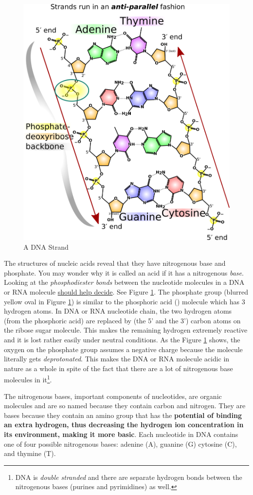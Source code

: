\documentclass[12pt]{article}
\begin{document}
\begin{figure}[ht!]
    \centering
    \includegraphics[width=0.6\linewidth]{DNA_chemical_structure-madprime.png}
    \caption{A DNA Strand}
    \label{fig: dna-strand}
\end{figure}


The structures of nucleic acids reveal that they have nitrogenous base and phosphate. You may wonder why it is called an acid if it has a nitrogenous \emph{base}. Looking at the \emph{phosphodiester bonds} between the nucleotide molecules in a DNA or RNA molecule \href{https://biology.stackexchange.com/questions/3864/dna-as-an-acid}{should help decide}. See Figure \ref{fig: dna-strand}. The phosphate group (blurred yellow oval in Figure \ref{fig: dna-strand}) is similar to the phosphoric acid () molecule which has 3 hydrogen atoms. In DNA or RNA nucleotide chain, the two hydrogen atoms (from the phosphoric acid) are replaced by (the 5' and the 3') carbon atoms on the ribose sugar molecule. This makes the remaining hydrogen extremely reactive and it is lost rather easily under neutral conditions. As the Figure \ref{fig: dna-strand} shows, the oxygen on the phosphate group assumes a negative charge because the molecule literally gets \emph{deprotonated}. This makes the DNA or RNA molecule acidic in nature as a whole in spite of the fact that there are a lot of nitrogenous base molecules in it\footnote{DNA is \emph{double stranded} and there are separate hydrogen bonds between the nitrogenous bases (purines and pyrimidines) as well.}.

The nitrogenous bases, important components of nucleotides, are organic molecules and are so named because they contain carbon and nitrogen. They are bases because they contain an amino group that has the \textbf{potential of binding an extra hydrogen, thus decreasing the hydrogen ion concentration in its environment, making it more basic}. Each nucleotide in DNA contains one of four possible nitrogenous bases: adenine (A), guanine (G) cytosine (C), and thymine (T).
\end{document}
